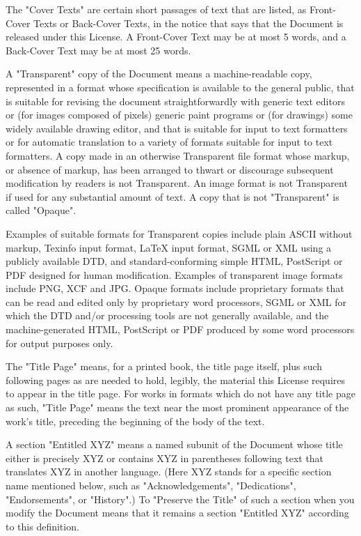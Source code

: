 \documentclass[oneside,english,a4paper,10pt,oneside,openany,final]{memoir}
\begin{document}
The "Cover Texts" are certain short passages of text that are listed, as Front-Cover Texts or Back-Cover Texts, in the notice that says that the Document is released under this License. A Front-Cover Text may be at most 5 words, and a Back-Cover Text may be at most 25 words.

A "Transparent" copy of the Document means a machine-readable copy, represented in a format whose specification is available to the general public, that is suitable for revising the document straightforwardly with generic text editors or (for images composed of pixels) generic paint programs or (for drawings) some widely available drawing editor, and that is suitable for input to text formatters or for automatic translation to a variety of formats suitable for input to text formatters. A copy made in an otherwise Transparent file format whose markup, or absence of markup, has been arranged to thwart or discourage subsequent modification by readers is not Transparent. An image format is not Transparent if used for any substantial amount of text. A copy that is not "Transparent" is called "Opaque".

Examples of suitable formats for Transparent copies include plain ASCII without markup, Texinfo input format, LaTeX input format, SGML or XML using a publicly available DTD, and standard-conforming simple HTML, PostScript or PDF designed for human modification. Examples of transparent image formats include PNG, XCF and JPG. Opaque formats include proprietary formats that can be read and edited only by proprietary word processors, SGML or XML for which the DTD and/or processing tools are not generally available, and the machine-generated HTML, PostScript or PDF produced by some word processors for output purposes only.

The "Title Page" means, for a printed book, the title page itself, plus such following pages as are needed to hold, legibly, the material this License requires to appear in the title page. For works in formats which do not have any title page as such, "Title Page" means the text near the most prominent appearance of the work's title, preceding the beginning of the body of the text.

A section "Entitled XYZ" means a named subunit of the Document whose title either is precisely XYZ or contains XYZ in parentheses following text that translates XYZ in another language. (Here XYZ stands for a specific section name mentioned below, such as "Acknowledgements", "Dedications", "Endorsements", or "History".) To "Preserve the Title" of such a section when you modify the Document means that it remains a section "Entitled XYZ" according to this definition.
\end{document}
